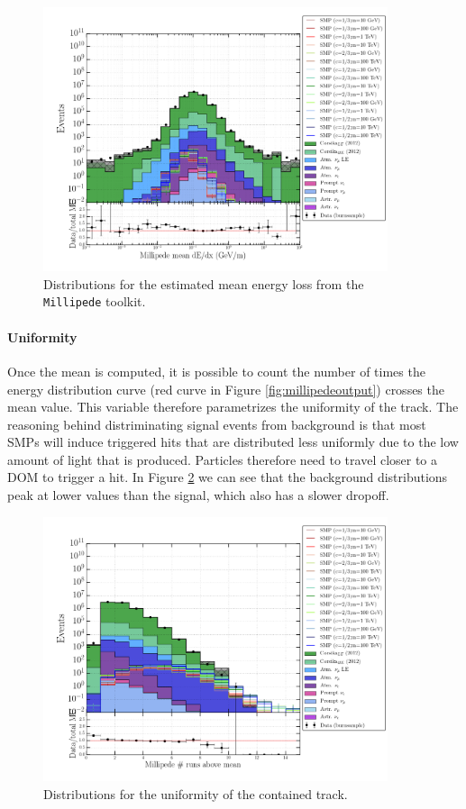 \begin{figure}
\centering
\includegraphics[width=0.9\textwidth]{chapter8/img/1D_stack_millipede_dedx_mean_nozeroes.png}
\caption{Distributions for the estimated mean energy loss from the \texttt{Millipede} toolkit.}
\label{fig:allmillipedevarmean}
\end{figure}

\paragraph{Uniformity}
Once the mean is computed, it is possible to count the number of times the energy distribution curve (red curve in Figure \ref{fig:millipedeoutput}) crosses the mean value. This variable therefore parametrizes the uniformity of the track. The reasoning behind distriminating signal events from background is that most SMPs will induce triggered hits that are distributed less uniformly due to the low amount of light that is produced. Particles therefore need to travel closer to a DOM to trigger a hit. In Figure \ref{fig:allmillipedevaruniformity} we can see that the background distributions peak at lower values than the signal, which also has a slower dropoff. 

\begin{figure}
\centering
\includegraphics[width=0.9\textwidth]{chapter8/img/1D_stack_millipede_dedx_runsabovemean.png}
\caption{Distributions for the uniformity of the contained track.}
\label{fig:allmillipedevaruniformity}
\end{figure}

